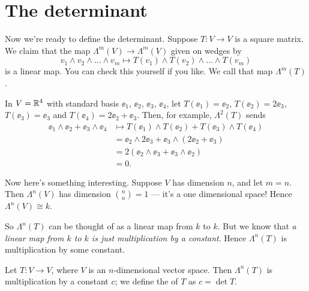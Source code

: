 \section{The determinant}
Now we're ready to define the determinant.
Suppose $T : V \to V$ is a square matrix.
We claim that the map $\Lambda^m(V) \to \Lambda^m(V)$ given on wedges by
\[ v_1 \wedge v_2 \wedge \dots \wedge v_m
	\mapsto T(v_1) \wedge T(v_2) \wedge \dots \wedge T(v_m) \]
is a linear map.
You can check this yourself if you like.
We call that map $\Lambda^m(T)$.
\begin{example}
	In $V = \mathbb R^4$ with standard basis $\ee_1$, $\ee_2$, $\ee_3$, $\ee_4$,
	let $T(\ee_1) = \ee_2$, $T(\ee_2) = 2\ee_3$, $T(\ee_3) = \ee_3$ and $T(\ee_4) = 2\ee_2 + \ee_3$.
	Then, for example, $\Lambda^2(T)$ sends
	\begin{align*}
		\ee_1 \wedge \ee_2 + \ee_3 \wedge \ee_4
		&\mapsto T(\ee_1) \wedge T(\ee_2) + T(\ee_3) \wedge T(\ee_4) \\
		&= \ee_2 \wedge 2\ee_3 + \ee_3 \wedge (2\ee_2 + \ee_3) \\
		&= 2(\ee_2 \wedge \ee_3 + \ee_3\wedge \ee_2) \\
		&= 0.
	\end{align*}
\end{example}

Now here's something interesting.
Suppose $V$ has dimension $n$, and let $m=n$.
Then $\Lambda^n(V)$ has dimension $\binom nn = 1$ --- it's a one dimensional space!
Hence $\Lambda^n(V) \cong k$.

So $\Lambda^n(T)$ can be thought of as a linear map from $k$ to $k$.
But we know that \emph{a linear map from $k$ to $k$ is just multiplication by a constant}.
Hence $\Lambda^n(T)$ is multiplication by some constant.
\begin{definition}
	Let $T : V \to V$, where $V$ is an $n$-dimensional vector space.
	Then $\Lambda^n(T)$ is multiplication by a constant $c$;
	we define the  of $T$ as $c = \det T$.
\end{definition}

